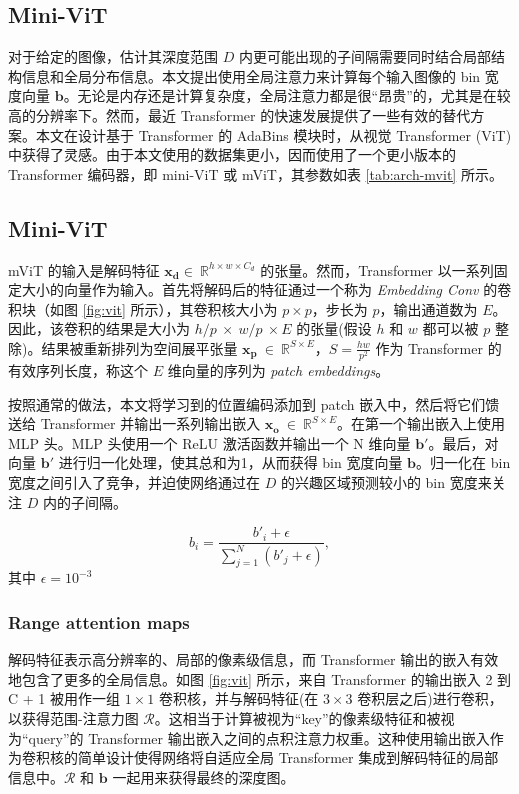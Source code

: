 \documentclass{vip-theme}
\begin{document}
\subsection{Mini-ViT}

对于给定的图像，估计其深度范围 $D$ 内更可能出现的子间隔需要同时结合局部结构信息和全局分布信息。本文提出使用全局注意力来计算每个输入图像的 bin 宽度向量 $\textbf{b}$。无论是内存还是计算复杂度，全局注意力都是很“昂贵”的，尤其是在较高的分辨率下。然而，最近 Transformer 的快速发展提供了一些有效的替代方案。本文在设计基于 Transformer 的 AdaBins 模块时，从视觉 Transformer (ViT) 中获得了灵感。由于本文使用的数据集更小，因而使用了一个更小版本的 Transformer 编码器，即 mini-ViT 或 mViT，其参数如表 \ref{tab:arch-mvit} 所示。

\subsection{Mini-ViT}

mViT 的输入是解码特征 $\mathbf{x_d}\in~\mathbb{R}^{h \times w \times C_d}$ 的张量。然而，Transformer 以一系列固定大小的向量作为输入。首先将解码后的特征通过一个称为 \textit{Embedding Conv} 的卷积块（如图 \ref{fig:vit} 所示），其卷积核大小为 $p\times p$，步长为 $p$，输出通道数为 $E$。因此，该卷积的结果是大小为 $h/p~\times~w/p~\times E$ 的张量(假设 $h$ 和 $w$ 都可以被 $p$ 整除)。结果被重新排列为空间展平张量 $\mathbf{x_p}~\in~\mathbb{R}^{S\times E}$，$S=\frac{hw}{p^2}$ 作为 Transformer 的有效序列长度，称这个 $E$ 维向量的序列为 \textit{patch embeddings}。

按照通常的做法，本文将学习到的位置编码添加到 patch 嵌入中，然后将它们馈送给 Transformer 并输出一系列输出嵌入 $\mathbf{x_o}~\in~\mathbb{R}^{S\times E}$。在第一个输出嵌入上使用 MLP 头。MLP 头使用一个 ReLU 激活函数并输出一个 N 维向量 $\textbf{b}'$。最后，对向量 $\textbf{b}'$ 进行归一化处理，使其总和为1，从而获得 bin 宽度向量 $\textbf{b}$。归一化在 bin 宽度之间引入了竞争，并迫使网络通过在 $D$ 的兴趣区域预测较小的 bin 宽度来关注 $D$ 内的子间隔。

\begin{equation}
    b_i = \frac{b'_i + \epsilon}{\sum_{j=1}^{N} (b'_j + \epsilon)},
\end{equation}
其中 $\epsilon=10^{-3}$

\subsubsection{Range attention maps}

解码特征表示高分辨率的、局部的像素级信息，而 Transformer 输出的嵌入有效地包含了更多的全局信息。如图 \ref{fig:vit} 所示，来自 Transformer 的输出嵌入 2 到 C + 1 被用作一组 $1 \times 1$ 卷积核，并与解码特征(在 $3\times 3$ 卷积层之后)进行卷积，以获得范围-注意力图 $\mathcal{R}$。这相当于计算被视为“key”的像素级特征和被视为“query”的 Transformer 输出嵌入之间的点积注意力权重。这种使用输出嵌入作为卷积核的简单设计使得网络将自适应全局 Transformer 集成到解码特征的局部信息中。$\mathcal{R}$ 和 $\textbf{b}$ 一起用来获得最终的深度图。
\end{document}

